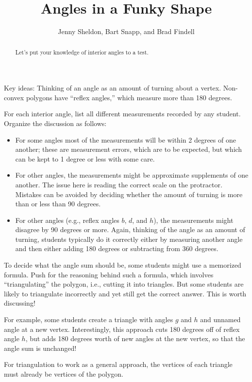 \documentclass[instructornotes,nooutcomes]{ximera}
\title{Angles in a Funky Shape}
\author{Jenny Sheldon, Bart Snapp, and Brad Findell}
\begin{document}
\begin{abstract}
  Let's put your knowledge of interior angles to a test.
\end{abstract}
\maketitle

\begin{teachingnote}
Key ideas: Thinking of an angle as an amount of turning about a vertex.  Non-convex polygons have ``reflex angles,'' which measure more than 180 degrees.  

For each interior angle, list all different measurements recorded by any student.  
Organize the discussion as follows: 
\begin{itemize}
\item For some angles most of the measurements will be within 2 degrees of one another; these are measurement errors, which are to be expected, but which can be kept to 1 degree or less with some care.  
\item For other angles, the measurements might be approximate supplements of one another.  The issue here is reading the correct scale on the protractor.  Mistakes can be avoided by deciding whether the amount of turning is more than or less than 90 degrees.  
\item For other angles (e.g., reflex angles $b$, $d$, and $h$), the measurements might disagree by 90 degrees or more.  Again, thinking of the angle as an amount of turning, students typically do it correctly either by measuring another angle and then either adding 180 degrees or subtracting from 360 degrees.
\end{itemize}

To decide what the angle sum should be, some students might use a memorized formula.  Push for the reasoning
behind such a formula, which involves ``triangulating'' the polygon, i.e., cutting it into triangles.  But some students are likely to triangulate incorrectly and yet still get the correct answer.  This is worth discussing! 
 
For example, some students create a triangle with angles $g$ and $h$ and unnamed angle at a new vertex.  Interestingly, this approach cuts 180 degrees off of reflex angle $h$, but adds 180 degrees worth of new angles at the new vertex, so that the angle sum is unchanged!  

For triangulation to work as a general approach, the vertices of each triangle must already be vertices of the polygon.  

\end{teachingnote}
\end{document}
